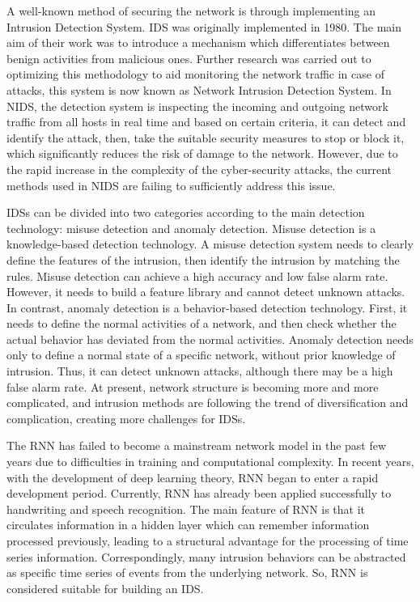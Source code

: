 A well-known method of securing the network is through implementing an Intrusion Detection System. IDS was originally implemented in 1980. The main aim of their work was to introduce a mechanism which differentiates between benign activities from malicious ones. Further research was carried out to optimizing this methodology to aid monitoring the network traffic in case of attacks, this system is now known as Network Intrusion Detection System. In NIDS, the detection system is inspecting the incoming and outgoing network traffic from all hosts in real time and based on certain criteria, it can detect and identify the attack, then, take the suitable security measures to stop or block it, which significantly reduces the risk of damage to the network. However, due to the rapid increase in the complexity of the cyber-security attacks, the current methods used in NIDS are failing to sufficiently address this issue\cite{al2020using}.
\par 
IDSs can be divided into two categories according to the main detection technology: misuse detection and anomaly detection. Misuse detection is a knowledge-based detection technology. A misuse detection system needs to clearly define the features of the intrusion, then identify the intrusion by matching the rules. Misuse detection can achieve a high accuracy and low false alarm rate. However, it needs to build a feature library and cannot detect unknown attacks. In contrast, anomaly detection is a behavior-based detection technology. First, it needs to define the normal activities of a network, and then check whether the actual behavior has deviated from the normal activities. Anomaly detection needs only to define a normal state of a specific network, without prior knowledge of intrusion. Thus, it can detect unknown attacks, although there may be a high false alarm rate. At present, network structure is becoming more and more complicated, and intrusion methods are following the trend of diversification and complication, creating more challenges for IDSs.\par 
The RNN has failed to become a mainstream network model in the past few years due to difficulties in training and computational complexity. In recent years, with the development of deep learning theory, RNN began to enter a rapid development period. Currently, RNN has already been applied successfully to handwriting and speech recognition. The main feature of RNN is that it circulates information in a hidden layer which can remember information processed previously, leading to a structural advantage for the processing of time series information. Correspondingly, many intrusion behaviors can be abstracted as specific time series of events from the underlying network. So, RNN is considered suitable for building an IDS\cite{xu2018intrusion}.
\par 
